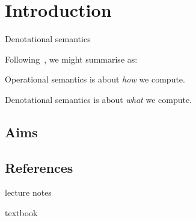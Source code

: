 \chapter{Introduction}

Denotational semantics~\cite{Scott1970,ScottStrachey1971}


Following~\cite{Escardo2007}, we might summarise as:

\begin{displayquote}
  Operational semantics is about \emph{how} we compute.

  Denotational semantics is about \emph{what} we compute.
\end{displayquote}


\cite{Escardo2007b}

\section{Aims}

\section{References}

\cite{AbramskyJung1994,GierzEtAl2003,Streicher2006,Hart2020,Escardo2007}

\cite{PittsWinskellFiore2012} lecture notes

\cite{Winskel1993} textbook

\cite{Streicher2006,Gunther1992}


